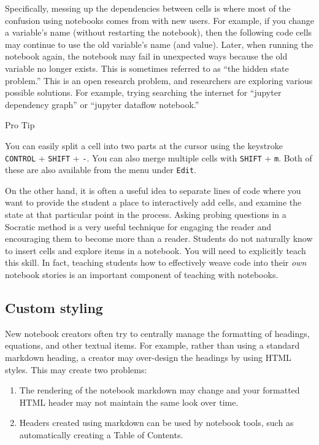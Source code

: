 \documentclass[]{book}
\let\BeginKnitrBlock\begin \let\EndKnitrBlock\end
\begin{document}
Specifically, messing up the dependencies between cells is where most
of the confusion using notebooks comes from with new users. For
example, if you change a variable's name (without restarting the
notebook), then the following code cells may continue to use the old
variable's name (and value). Later, when running the notebook again,
the notebook may fail in unexpected ways because the old variable no
longer exists. This is sometimes referred to as ``the hidden state
problem.'' This is an open research problem, and researchers are
exploring various possible solutions. For example, trying searching
the internet for ``jupyter dependency graph'' or ``jupyter dataflow
notebook.''

\BeginKnitrBlock{rmdnote}
Pro Tip

You can easily split a cell into two parts at the cursor using the
keystroke \texttt{CONTROL} + \texttt{SHIFT} + \texttt{-}. You can also merge multiple cells
with \texttt{SHIFT} + \texttt{m}. Both of these are also available from the menu
under \texttt{Edit}.
\EndKnitrBlock{rmdnote}

On the other hand, it is often a useful idea to separate lines of code
where you want to provide the student a place to interactively add
cells, and examine the state at that particular point in the
process. Asking probing questions in a Socratic method is a very
useful technique for engaging the reader and encouraging them to
become more than a reader. Students do not naturally know to insert
cells and explore items in a notebook. You will need to explicitly
teach this skill. In fact, teaching students how to effectively weave
code into their \emph{own} notebook stories is an important component of
teaching with notebooks.

\hypertarget{custom-styling}{%
\subsection{Custom styling}\label{custom-styling}}

New notebook creators often try to centrally manage the formatting of
headings, equations, and other textual items. For example, rather than
using a standard markdown heading, a creator may over-design the
headings by using HTML styles. This may create two problems:

\begin{enumerate}
\def\labelenumi{\arabic{enumi}.}
\item
  The rendering of the notebook markdown may change and your
  formatted HTML header may not maintain the same look over time.
\item
  Headers created using markdown can be used by notebook tools,
  such as automatically creating a Table of Contents.
\end{enumerate}
\end{document}
